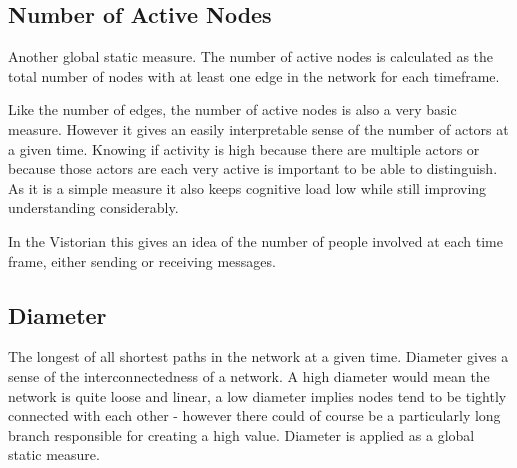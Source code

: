 \subsection{Number of Active Nodes}
Another global static measure. The number of active nodes is calculated as the total number of nodes with at least one edge in the network for each timeframe.

Like the number of edges, the number of active nodes is also a very basic measure. However it gives an easily interpretable sense of the number of actors at a given time. Knowing if activity is high because there are multiple actors or because those actors are each very active is important to be able to distinguish. As it is a simple measure it also keeps cognitive load low while still improving understanding considerably.

In the Vistorian this gives an idea of the number of people involved at each time frame, either sending or receiving messages. 


\subsection{Diameter}
The longest of all shortest paths in the network at a given time. Diameter gives a sense of the interconnectedness of a network. A high diameter would mean the network is quite loose and linear, a low diameter implies nodes tend to be tightly connected with each other - however there could of course be a particularly long branch responsible for creating a high value. Diameter is applied as a global static measure.

